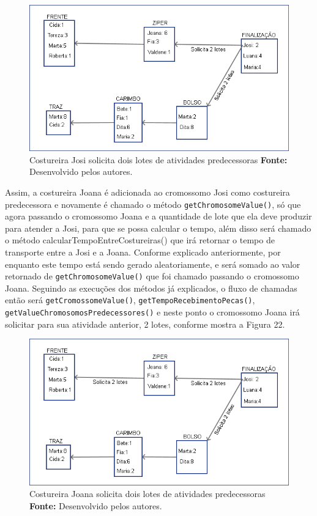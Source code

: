 \begin{figure}[h!]
	\centerline{\includegraphics[scale=0.6]{./imagens/processo_solciitacao_de_lotes1.png}}
	\caption[Distribuição de trabalho]
	{Costureira Josi solicita dois lotes de atividades predecessoras
	\textbf{Fonte:} Desenvolvido pelos autores.}
	\label{fig:exemplo1}
\end{figure}


\par Assim, a costureira Joana é adicionada ao cromossomo Josi como costureira
predecessora e novamente é chamado o método \texttt{getChromosomeValue()}, só que agora passando o cromossomo Joana e a quantidade
de lote que ela deve produzir para atender a Josi, para que se possa calcular o tempo, além disso será chamado o método 
calcularTempoEntreCostureiras() que irá retornar o tempo de transporte
entre a Josi e a Joana. Conforme explicado anteriormente, 
por enquanto este tempo está sendo gerado aleatoriamente, e será somado ao valor retornado de \texttt{getChromosomeValue()}
que  foi chamado passando o cromossomo Joana. 
Seguindo as execuções dos métodos já explicados, o fluxo de chamadas então será
\texttt{getCromossomeValue()}, \texttt{getTempoRecebimentoPecas()}, \texttt{getValueChromosomosPredecessores()} e 
neste ponto o cromossomo Joana irá solicitar para sua atividade anterior, 2
lotes, conforme mostra a Figura 22.


\begin{figure}[h!]
	\centerline{\includegraphics[scale=0.7]{./imagens/processo_solciitacao_de_lotes2.png}}
	\caption[Distribuição de trabalho]
	{Costureira Joana solicita dois lotes de atividades predecessoras 
	\textbf{Fonte:} Desenvolvido pelos autores.}
	\label{fig:exemplo1}
\end{figure}

